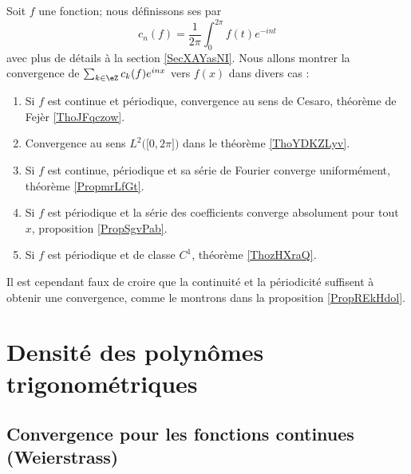 
Soit \( f\) une fonction; nous définissons ses  par
\begin{equation}
    c_n(f)=\frac{1}{ 2\pi }\int_0^{2\pi}f(t) e^{-int}
\end{equation}
avec plus de détails à la section \ref{SecXAYasNI}. Nous allons montrer la convergence de \( \sum_{k\in \eZ}c_k(f) e^{inx}\) vers \( f(x)\) dans divers cas :
\begin{enumerate}
    \item
        Si \( f\) est continue et périodique, convergence au sens de Cesaro, théorème de Fejèr \ref{ThoJFqczow}.
    \item
        Convergence au sens \( L^2\Big( \mathopen[ 0 , 2\pi \mathclose] \Big)\) dans le théorème \ref{ThoYDKZLyv}.
    \item
        Si \( f\) est continue, périodique et sa série de Fourier converge uniformément, théorème \ref{PropmrLfGt}.
    \item
        Si \( f\) est périodique et la série des coefficients converge absolument pour tout \( x\), proposition \ref{PropSgvPab}.
    \item
        Si \( f\) est périodique et de classe \( C^1\), théorème \ref{ThozHXraQ}.
\end{enumerate}
Il est cependant faux de croire que la continuité et la périodicité suffisent à obtenir une convergence, comme le montrons dans la proposition \ref{PropREkHdol}.

\section{Densité des polynômes trigonométriques}

\subsection{Convergence pour les fonctions continues (Weierstrass)}

